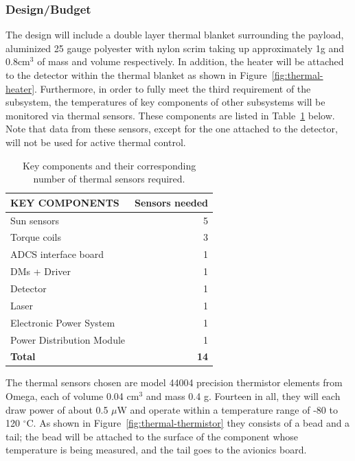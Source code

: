 \documentclass[12pt]{article}
\begin{document}
\subsubsection{Design/Budget}

The design will include a double layer thermal blanket surrounding the payload, aluminized 25 gauge polyester with nylon scrim taking up approximately 1g and 0.8cm$^3$ of mass and volume respectively. In addition, the heater will be attached to the detector within the thermal blanket as shown in Figure~\ref{fig:thermal-heater}.  Furthermore, in order to fully meet the third requirement of the subsystem, the temperatures of key components of other subsystems will be monitored via thermal sensors.  These components are listed in Table~\ref{table:thermal-sensors} below.  Note that data from these sensors, except for the one attached to the detector, will not be used for active thermal control.

\begin{table}[ht]%
\centering
\caption{Key components and their corresponding number of thermal sensors required.}
\label{table:thermal-sensors}
\begin{tabular}{|l|r|}\hline
\textbf{KEY COMPONENTS} & \textbf{Sensors needed} \\\hline
Sun sensors & 5 \\\hline
Torque coils & 3 \\\hline
ADCS interface board & 1 \\\hline
DMs + Driver & 1 \\\hline
Detector & 1 \\\hline
Laser & 1 \\\hline
Electronic Power System & 1 \\\hline
Power Distribution Module & 1 \\\hline
\textbf{Total} & \textbf{14} \\\hline
\end{tabular}
\end{table}

The thermal sensors chosen are model 44004 precision thermistor elements from Omega, each of volume 0.04 cm$^3$ and mass 0.4 g. Fourteen in all, they will each draw power of about 0.5 $\mu$W and operate within a temperature range of -80 to 120 $^\circ$C. As shown in Figure~\ref{fig:thermal-thermistor} they consists of a bead and a tail; the bead will be attached to the surface of the component whose temperature is being measured, and the tail goes to the avionics board.
\end{document}
